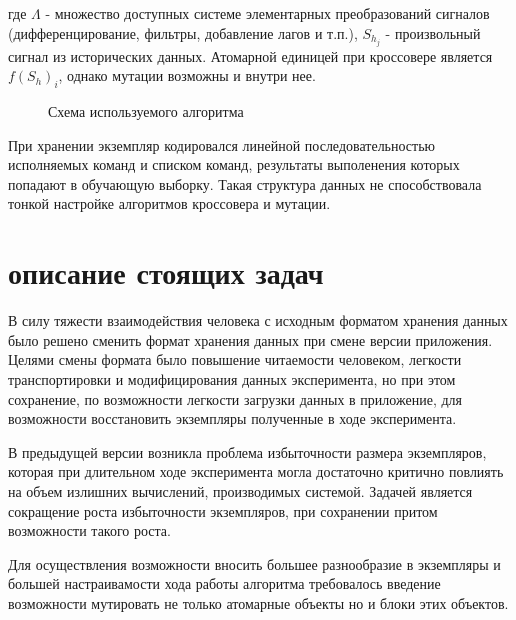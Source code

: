 \documentclass[utf8,usehyperref,12pt]{G7-32}
\begin{document}
где $\Lambda$ - множество доступных системе элементарных преобразований сигналов (дифференцирование, фильтры, добавление лагов и т.п.), $S_{h_{j}}$ - произвольный сигнал из исторических данных. Атомарной единицей при кроссовере является $f(S_{h})_{i}$, однако мутации возможны и внутри нее.\\
\begin{figure}[H]
 \caption{Схема используемого алгоритма}\label{algo}
\end{figure}

При хранении экземпляр кодировался линейной последовательностью исполняемых команд и списком команд, результаты выполенения которых попадают в обучающую выборку. Такая структура данных не способствовала тонкой настройке алгоритмов кроссовера и мутации.
\section{описание стоящих задач}
В силу тяжести взаимодействия человека с исходным форматом хранения данных было решено сменить формат хранения данных при смене версии приложения. Целями смены формата было повышение читаемости человеком, легкости транспортировки и модифицирования данных эксперимента, но при этом сохранение, по возможности легкости загрузки данных в приложение, для возможности восстановить экземпляры полученные в ходе эксперимента.

В предыдущей версии возникла проблема избыточности размера экземпляров, которая при длительном ходе эксперимента могла достаточно критично повлиять на объем излишних вычислений, производимых системой. Задачей является сокращение роста избыточности экземпляров, при сохранении притом возможности такого роста.

Для осуществления возможности вносить большее разнообразие в экземпляры и большей настраивамости хода работы алгоритма требовалось введение возможности мутировать не только атомарные объекты но и блоки этих объектов.
\end{document}
